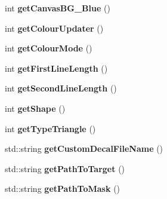 \begin{DoxyCompactItemize}
\item 
\hypertarget{class_config_reader_a61718c31162418d22f3119bfc9d43f75}{int {\bfseries get\-Canvas\-B\-G\-\_\-\-Blue} ()}\label{class_config_reader_a61718c31162418d22f3119bfc9d43f75}

\item 
\hypertarget{class_config_reader_aa0093d6cc78780960771c5abd12937a1}{int {\bfseries get\-Colour\-Updater} ()}\label{class_config_reader_aa0093d6cc78780960771c5abd12937a1}

\item 
\hypertarget{class_config_reader_ae408fab7b0a2a214621f02d0c019a4e7}{int {\bfseries get\-Colour\-Mode} ()}\label{class_config_reader_ae408fab7b0a2a214621f02d0c019a4e7}

\item 
\hypertarget{class_config_reader_af337f0c19e0ed70d586a7471fc0b2d5e}{int {\bfseries get\-First\-Line\-Length} ()}\label{class_config_reader_af337f0c19e0ed70d586a7471fc0b2d5e}

\item 
\hypertarget{class_config_reader_a5f2b66c0fecfb1c542c68c3f89d4361f}{int {\bfseries get\-Second\-Line\-Length} ()}\label{class_config_reader_a5f2b66c0fecfb1c542c68c3f89d4361f}

\item 
\hypertarget{class_config_reader_a151c30e6eafab6be5d0f7f86659508bf}{int {\bfseries get\-Shape} ()}\label{class_config_reader_a151c30e6eafab6be5d0f7f86659508bf}

\item 
\hypertarget{class_config_reader_a09ef925e405ebd002bbe61c554020dcc}{int {\bfseries get\-Type\-Triangle} ()}\label{class_config_reader_a09ef925e405ebd002bbe61c554020dcc}

\item 
\hypertarget{class_config_reader_a8f9d90b2ea2da85939040a41b1395260}{std\-::string {\bfseries get\-Custom\-Decal\-File\-Name} ()}\label{class_config_reader_a8f9d90b2ea2da85939040a41b1395260}

\item 
\hypertarget{class_config_reader_a6f42945c6aa5a1669ccd59c3f998b456}{std\-::string {\bfseries get\-Path\-To\-Target} ()}\label{class_config_reader_a6f42945c6aa5a1669ccd59c3f998b456}

\item 
\hypertarget{class_config_reader_a44d2bef5c4bc3d42ff4d5e1a6d6dae4f}{std\-::string {\bfseries get\-Path\-To\-Mask} ()}\label{class_config_reader_a44d2bef5c4bc3d42ff4d5e1a6d6dae4f}


\end{DoxyCompactItemize}
